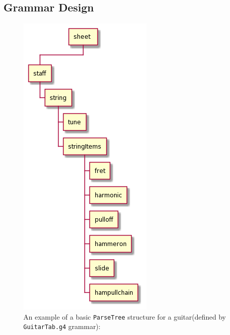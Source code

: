 \documentclass[11pt]{article}
\begin{document}
\subsection{Grammar Design}
\label{sec:org4f9f545}
\begin{figure}[htbp]
\centering
\includegraphics[width=.9\linewidth]{./Diagrams/backend-guitar-grammar-diagram.png}
\caption{An example of a basic \texttt{ParseTree} structure for a guitar(defined by \texttt{GuitarTab.g4} grammar):}
\end{figure}
\end{document}
